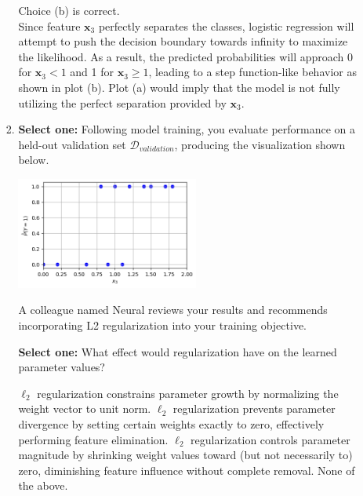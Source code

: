 \documentclass[11pt,addpoints,answers]{exam}
\newcommand{\xv}{\mathbf{x}}
\newcommand{\sone}{\textbf{Select one: }}
\begin{document}
\begin{enumerate}
\begin{enumerate}[label=\alph*), itemsep=10pt]
\begin{enumerate}[label=(\roman*), leftmargin=*]
				\begin{your_solution}[height=5cm]
					Choice (b) is correct. \\
					Since feature $\xv_3$ perfectly separates the classes, logistic regression will attempt to push the decision boundary towards infinity to maximize the likelihood. As a result, the predicted probabilities will approach 0 for $\xv_3 < 1$ and 1 for $\xv_3 \geq 1$, leading to a step function-like behavior as shown in plot (b). Plot (a) would imply that the model is not fully utilizing the perfect separation provided by $\xv_3$.
				\end{your_solution}
				
				\item \sone   
				Following model training, you evaluate performance on a held-out validation set $\mathcal{D}_{validation}$, producing the visualization shown below.
				
				\begin{center}
					\includegraphics[width=6cm]{fig/Plot Validation.png}
				\end{center}
				
				A colleague named Neural reviews your results and recommends incorporating L2 regularization into your training objective. 
				
				\sone What effect would regularization have on the learned parameter values?
				
				
				{%
					
					\begin{checkboxes}
						\checkboxchar{$\Box$} \checkedchar{$\blacksquare$}
						\choice $\ell_2$ regularization constrains parameter growth by normalizing the weight vector to unit norm.
						\choice $\ell_2$ regularization prevents parameter divergence by setting certain weights exactly to zero, effectively performing feature elimination. 
						\CorrectChoice $\ell_2$ regularization controls parameter magnitude by shrinking weight values toward (but not necessarily to) zero, diminishing feature influence without complete removal. 
						\choice None of the above.
					\end{checkboxes}
				}
				
				
			\end{enumerate}
		\end{enumerate}
		
	\end{enumerate}
\end{document}
